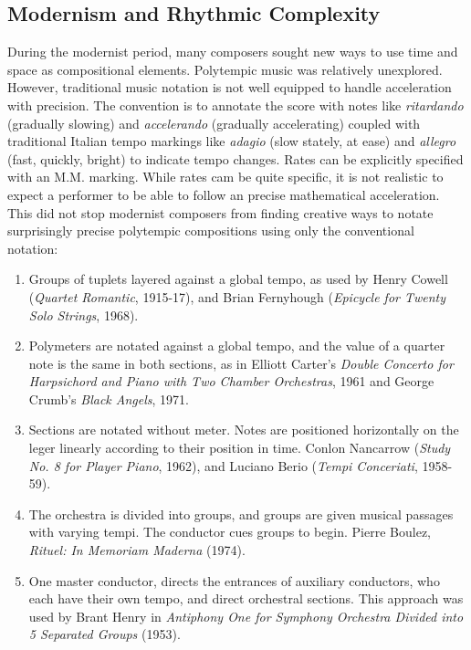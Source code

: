 \subsection{Modernism and Rhythmic Complexity}
\label{sec:modern-rhythm-compl}
During the modernist period, many composers sought new ways to use
time and space as compositional elements. Polytempic music was
relatively unexplored. However, traditional music notation is not well
equipped to handle acceleration with precision. The convention is to
annotate the score with notes like \textit{ritardando} (gradually
slowing) and \textit{accelerando} (gradually accelerating) coupled
with traditional Italian tempo markings like \textit{adagio} (slow
stately, at ease) and \textit{allegro} (fast, quickly, bright) to
indicate tempo changes. Rates can be explicitly specified with an
M.M.
marking. While rates cam be quite specific, it is not realistic to
expect a performer to be able to follow an precise mathematical
acceleration. This did not stop modernist composers from finding
creative ways to notate surprisingly precise polytempic compositions
using only the conventional notation:
\begin{enumerate}
\item Groups of tuplets layered against a global tempo, as used by
  Henry Cowell (\textit{Quartet Romantic}, 1915-17), and Brian Fernyhough
  (\textit{Epicycle for Twenty Solo Strings}, 1968).
\item Polymeters are notated against a global tempo, and the value of
  a quarter note is the same in both sections, as in Elliott Carter's \textit{Double
    Concerto for Harpsichord and Piano with Two Chamber Orchestras}, 1961
  and George Crumb's \textit{Black Angels}, 1971.
\item Sections are notated without meter. Notes are positioned
  horizontally on the leger linearly according to their position in
  time. Conlon Nancarrow (\textit{Study No. 8 for Player Piano},
  1962), and Luciano Berio (\textit{Tempi Conceriati}, 1958-59).
\item The orchestra is divided into groups, and groups are given
  musical passages with varying tempi. The conductor cues groups to
  begin. Pierre Boulez, \textit{Rituel: In Memoriam Maderna} (1974).
\item One master conductor, directs the entrances of auxiliary
  conductors, who each have their own tempo, and direct orchestral
  sections. This approach was used by Brant Henry in \textit{Antiphony
    One for Symphony Orchestra Divided into 5 Separated Groups} (1953).
\end{enumerate}

